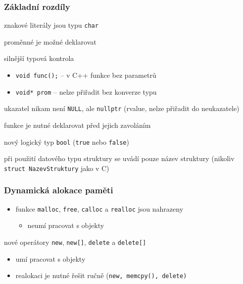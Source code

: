 
\begin{frame}[fragile]
\frametitle{Základní rozdíly}
\begin{bitemize}
\item znakové literály jsou typu \lstinline|char|
\item proměnné je možné deklarovat 
\item silnější typová kontrola
\begin{itemize}
\item \lstinline|void func();| -- v C++ funkce bez parametrů
\item \lstinline|void* prom| -- nelze přiřadit bez konverze typu
\end{itemize}
\item ukazatel nikam není \lstinline|NULL|, ale \lstinline|nullptr| (rvalue, nelze přiřadit do neukazatele)
\item funkce je nutné deklarovat před jejich zavoláním
\item nový logický typ \lstinline|bool| (\lstinline|true| nebo \lstinline|false|)
\item při použití datového typu struktury se uvádí pouze název struktury (nikoliv \lstinline|struct NazevStruktury| jako v C)
\end{bitemize}
\end{frame}

\begin{frame}[fragile]
\frametitle{Dynamická alokace paměti}

\begin{oldblock}
\begin{itemize}
\item funkce \lstinline|malloc|, \lstinline|free|, \lstinline|calloc| a \lstinline|realloc| jsou nahrazeny
\begin{itemize}
\item neumí pracovat s objekty
\end{itemize}
\end{itemize}
\end{oldblock}
\begin{bitemize}
\item nové operátory \lstinline|new|, \lstinline|new[]|, \lstinline|delete| a \lstinline|delete[]|
\begin{itemize}
\item umí pracovat s objekty
\item realokaci je nutné řešit ručně (\lstinline|new, memcpy(), delete)|
\end{itemize}
\end{bitemize}
\end{frame}


